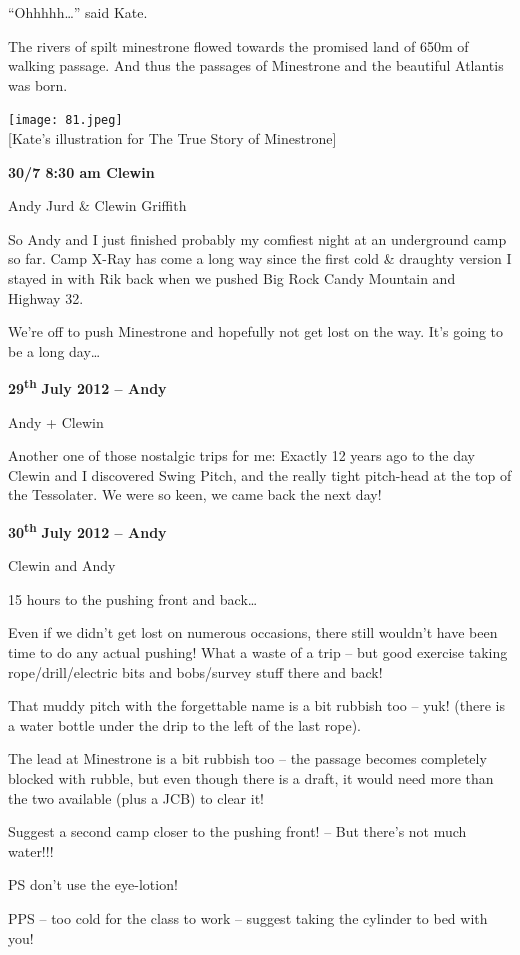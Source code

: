 ``Ohhhhh\ldots{}'' said Kate.

The rivers of spilt minestrone flowed towards the promised land of 650m
of walking passage. And thus the passages of Minestrone and the
beautiful Atlantis was born.

\texttt{[image: 81.jpeg]}\\
{[}Kate's illustration for The True Story of Minestrone{]}

\textbf{30/7 8:30 am Clewin}

Andy Jurd \& Clewin Griffith

So Andy and I just finished probably my comfiest night at an underground
camp so far. Camp X-Ray has come a long way since the first cold \&
draughty version I stayed in with Rik back when we pushed Big Rock Candy
Mountain and Highway 32.

We're off to push Minestrone and hopefully not get lost on the way. It's
going to be a long day\ldots{}

\textbf{29\textsuperscript{th}} \textbf{July 2012 -- Andy}

Andy + Clewin

Another one of those nostalgic trips for me: Exactly 12 years ago to the
day Clewin and I discovered Swing Pitch, and the really tight pitch-head
at the top of the Tessolater. We were so keen, we came back the next
day!

\textbf{30\textsuperscript{th}} \textbf{July 2012 -- Andy}

Clewin and Andy

15 hours to the pushing front and back\ldots{}

Even if we didn't get lost on numerous occasions, there still wouldn't
have been time to do any actual pushing! What a waste of a trip -- but
good exercise taking rope/drill/electric bits and bobs/survey stuff
there and back!

That muddy pitch with the forgettable name is a bit rubbish too -- yuk!
(there is a water bottle under the drip to the left of the last rope).

The lead at Minestrone is a bit rubbish too -- the passage becomes
completely blocked with rubble, but even though there is a draft, it
would need more than the two available (plus a JCB) to clear it!

Suggest a second camp closer to the pushing front! -- But there's not
much water!!!

PS don't use the eye-lotion!

PPS -- too cold for the class to work -- suggest taking the cylinder to
bed with you!

